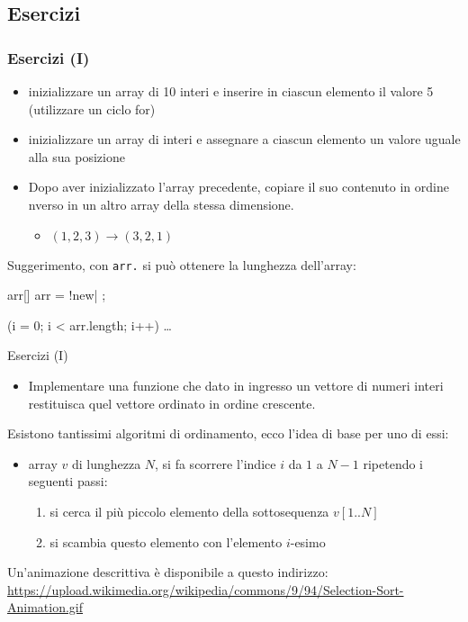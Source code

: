 \subsection[Esercizi]{Esercizi}

\begin{frame}[fragile]\frametitle{Esercizi (I)}

  \begin{itemize}
    \item inizializzare un array  di 10 interi e inserire in ciascun elemento
	  il valore 5 (utilizzare un ciclo for)
    \item inizializzare un  array  di  interi e assegnare a ciascun elemento
	  un valore uguale alla sua posizione 
    \item Dopo aver inizializzato l'array precedente, copiare il suo  contenuto 
	  in ordine nverso in un altro array della stessa dimensione.
    \begin{itemize}
      \item $(1, 2, 3) \rightarrow (3, 2, 1)$
    \end{itemize}
  \end{itemize}

  Suggerimento, con \texttt{arr.} si può ottenere la lunghezza dell'array:
  \begin{JavaCodePlain}[commandchars=\\!|]
    \Jint arr[]
    arr = \Word!new| \Jint[10];
    
    \Jfor (\Jint i = 0; i < arr.length; i++) {
      \dots
    }  
  \end{JavaCodePlain}

\end{frame}

\begin{frame}{Esercizi (I)}

  \begin{itemize}
  \item Implementare una funzione che dato in ingresso un vettore di numeri interi
	restituisca quel vettore ordinato in ordine crescente.
  \end{itemize}

  Esistono tantissimi algoritmi di ordinamento, ecco l'idea di base per uno di essi:
  \begin{itemize}
   \item array $v$ di lunghezza $N$, si fa scorrere l'indice $i$ da  $1$ a $N-1$ ripetendo i seguenti passi:
   \begin{enumerate}
    \item si cerca il più piccolo elemento della sottosequenza $v[1..N]$
    \item si scambia questo elemento con l'elemento $i$-esimo
   \end{enumerate}
  \end{itemize}

  Un'animazione descrittiva è disponibile a questo indirizzo:
  {\scriptsize \url{https://upload.wikimedia.org/wikipedia/commons/9/94/Selection-Sort-Animation.gif}}

\end{frame}

